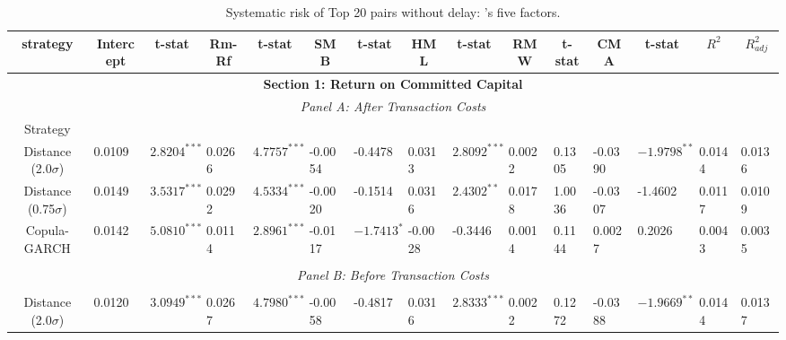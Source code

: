 \documentclass[a4paper]{article}
\begin{document}
	
	\begin{sidewaystable}
		\caption{Systematic risk of Top 20 pairs without delay: \citet*{ff15}'s five factors.}
		\begin{threeparttable}[H]
			\centering \scriptsize
			\begin{tabularx}{\textwidth}{@{\extracolsep{\fill}}lllllllllllllll@{}}
				\toprule
				\multicolumn{1}{c}{strategy} & \multicolumn{1}{c}{Intercept} & \multicolumn{1}{c}{t-stat} & \multicolumn{1}{c}{Rm-Rf} & \multicolumn{1}{c}{t-stat} & \multicolumn{1}{c}{SMB} & \multicolumn{1}{c}{t-stat} & \multicolumn{1}{c}{HML} & \multicolumn{1}{c}{t-stat} & \multicolumn{1}{c}{RMW} & \multicolumn{1}{c}{t-stat} & \multicolumn{1}{c}{CMA} & \multicolumn{1}{c}{t-stat} & \multicolumn{1}{c}{$R^{2}$} & \multicolumn{1}{c}{$R^{2}_{adj}$} \\
				\midrule
				\multicolumn{15}{c}{\textbf{Section 1: Return on Committed Capital}} \\
				\multicolumn{15}{c}{\textit{Panel A: After Transaction Costs}} \\
				\multicolumn{1}{c}{Strategy} & \multicolumn{1}{c}{} & \multicolumn{1}{c}{} & \multicolumn{1}{c}{} & \multicolumn{1}{c}{} & \multicolumn{1}{c}{} & \multicolumn{1}{c}{} & \multicolumn{1}{c}{} &       &       &       &       &       &       &  \\
				\multicolumn{1}{c}{Distance (2.0$\sigma$)} & 0.0109 & $2.8204^{***}$ & 0.0266 & $4.7757^{***}$ & -0.0054 & -0.4478 & 0.0313 & $2.8092^{***}$ & 0.0022 & 0.1305 & -0.0390 & $-1.9798^{**}$ & 0.0144 & 0.0136 \\
				\multicolumn{1}{c}{Distance (0.75$\sigma$)} & 0.0149 & $3.5317^{***}$ & 0.0292 & $4.5334^{***}$ & -0.0020 & -0.1514 & 0.0316 & $2.4302^{**}$ & 0.0178 & 1.0036 & -0.0307 & -1.4602 & 0.0117 & 0.0109  \\
				\multicolumn{1}{c}{Copula-GARCH} & 0.0142 & $5.0810^{***}$ & 0.0114 & $2.8961^{***}$ & -0.0117 & $-1.7413^{*}$ & -0.0028 & -0.3446 & 0.0014 & 0.1144 & 0.0027 & 0.2026 & 0.0043 & 0.0035 \\
				&       &       &       &       &       &       &       &       &       &       &       &       &       &  \\
				\multicolumn{15}{c}{\textit{Panel B: Before Transaction Costs}} \\
				&       &       &       &       &       &       &       &       &       &       &       &       &       &  \\
				\multicolumn{1}{c}{Distance (2.0$\sigma$)} & 0.0120 & $3.0949^{***}$ & 0.0267 & $4.7980^{***}$ & -0.0058 & -0.4817 & 0.0316 & $2.8333^{***}$ & 0.0022 & 0.1272 & -0.0388 & $-1.9669^{**}$ & 0.0144 & 0.0137 \\

\end{tabularx}
\end{threeparttable}
\end{sidewaystable}
\end{document}
